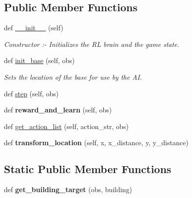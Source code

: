 \subsection*{Public Member Functions}
\begin{DoxyCompactItemize}
\item 
def \hyperlink{classBotty__McBotface_1_1Botty_a2b20c5c22329f5a75ef3c343e630a4c1}{\+\_\+\+\_\+init\+\_\+\+\_\+} (self)\hypertarget{classBotty__McBotface_1_1Botty_a2b20c5c22329f5a75ef3c343e630a4c1}{}\label{classBotty__McBotface_1_1Botty_a2b20c5c22329f5a75ef3c343e630a4c1}

\begin{DoxyCompactList}\small\item\em Constructor \+:-\/ Initializes the RL brain and the game state. \end{DoxyCompactList}\item 
def \hyperlink{classBotty__McBotface_1_1Botty_a979fe38b2208653ab5195c7115e978c4}{init\+\_\+base} (self, obs)
\begin{DoxyCompactList}\small\item\em Sets the location of the base for use by the AI. \end{DoxyCompactList}\item 
def \hyperlink{classBotty__McBotface_1_1Botty_a6ad2ce98b25c627204c31f37d26d40dc}{step} (self, obs)
\item 
def {\bfseries reward\+\_\+and\+\_\+learn} (self, obs)\hypertarget{classBotty__McBotface_1_1Botty_aaf8459960013f8b5e21e0928d7031026}{}\label{classBotty__McBotface_1_1Botty_aaf8459960013f8b5e21e0928d7031026}

\item 
def \hyperlink{classBotty__McBotface_1_1Botty_a230761c2312622094689a0950b1851a9}{get\+\_\+action\+\_\+list} (self, action\+\_\+str, obs)
\item 
def {\bfseries transform\+\_\+location} (self, x, x\+\_\+distance, y, y\+\_\+distance)\hypertarget{classBotty__McBotface_1_1Botty_a0d6257b0994cb62993fd6346f77d97dc}{}\label{classBotty__McBotface_1_1Botty_a0d6257b0994cb62993fd6346f77d97dc}

\end{DoxyCompactItemize}
\subsection*{Static Public Member Functions}
\begin{DoxyCompactItemize}
\item 
def {\bfseries get\+\_\+building\+\_\+target} (obs, building)\hypertarget{classBotty__McBotface_1_1Botty_a729cd86d54aa83a7f01a458d03fde940}{}\label{classBotty__McBotface_1_1Botty_a729cd86d54aa83a7f01a458d03fde940}

\end{DoxyCompactItemize}
